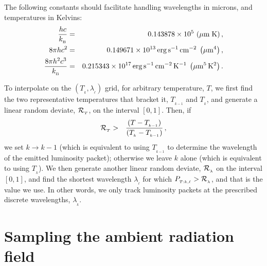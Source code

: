 \documentclass[usenatbib]{mn2e}
\numberwithin{equation}{section}
\begin{document}
The following constants should facilitate handling wavelengths in microns, and temperatures in Kelvins:
\begin{eqnarray}
\frac{hc}{k_{_{\rm B}}}&=&0.143878\times 10^5\,\left(\mu{\rm m}\;{\rm K}\right),\\
8\pi hc^2&=&0.149671\times 10^{13}\,{\rm erg}\,{\rm s}^{-1}\,{\rm cm}^{-2}\;\left(\mu{\rm m}^4\right),\\\nonumber
\frac{8\pi h^2c^3}{k_{_{\rm B}}}&=&0.215343\times 10^{17}\,{\rm erg}\,{\rm s}^{-1}\,{\rm cm}^{-2}\,{\rm K}^{-1}\;\left(\mu{\rm m}^5\,{\rm K}^2\right).\\
\end{eqnarray}

To interpolate on the $(T_{_k},\lambda_{_\ell})$ grid, for arbitrary temperature, $T$, we first find the two representative temperatures that bracket it, $T_{_{k-1}}$ and $T_{_k}$, and generate a linear random deviate, ${\cal R}_{_T}$, on the interval $[0,1]$. Then, if
\begin{eqnarray}
{\cal R}_{_T}&>&\frac{(T-T_{_{k-1}})}{(T_{_k}-T_{_{k-1}})}\,,
\end{eqnarray}
we set $k\rightarrow k-1$ (which is equivalent to using $T_{_{k-1}}$ to determine the wavelength of the emitted luminosity packet); otherwise we leave $k$ alone (which is equivalent to using $T_{_k}$). We then generate another linear random deviate, ${\cal R}_{_\lambda}$ on the interval $[0,1]$, and find the shortest wavelength $\lambda_{_\ell}$ for which $P_{_{T:k,\ell}}>{\cal R}_{_\lambda}$, and that is the value we use. In other words, we only track luminosity packets at the prescribed discrete wavelengths, $\lambda_{_k}$.





\section{Sampling the ambient radiation field}
\end{document}
